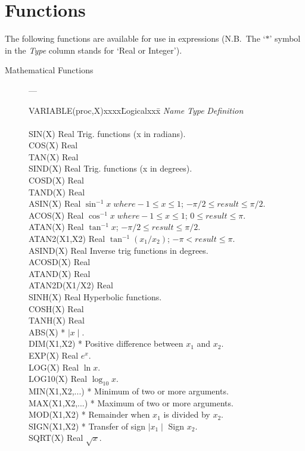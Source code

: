 \section{Functions}

The following functions are available for use in expressions (N.B.\ The `$*$'
symbol in the {\em Type} column stands for `Real or Integer').

\begin{description}

\item [Mathematical Functions] ---

\begin{tabbing}
VARIABLE(proc,X)xxxx\=Logicalxxx\=\kill
{\em Name} \> {\em Type} \> {\em Definition} \\
\\
SIN(X) \> Real \> Trig. functions (x in radians). \\
COS(X) \> Real \\
TAN(X) \> Real \\
SIND(X) \> Real \> Trig. functions (x in degrees). \\
COSD(X) \> Real \\
TAND(X) \> Real \\
ASIN(X) \> Real \> $\sin^{-1} x \; where -1 \leq x \leq 1 $;
 $ -\pi/2 \leq result \leq \pi/2$.\\
ACOS(X) \> Real \> $\cos^{-1} x \; where -1 \leq x \leq 1 $;
 $ 0 \leq result \leq \pi$.\\
ATAN(X) \> Real \> $\tan^{-1} x $; $ -\pi/2 \leq result \leq \pi/2$.\\
ATAN2(X1,X2) \> Real \> $\tan^{-1} (x_{1}/x_{2}) $; $ -\pi < result \leq \pi $.\\
ASIND(X) \> Real \> Inverse trig functions in degrees. \\
ACOSD(X) \> Real \\
ATAND(X) \> Real \\
ATAN2D(X1/X2) \> Real \\
SINH(X) \> Real \> Hyperbolic functions. \\
COSH(X) \> Real \\
TANH(X) \> Real \\
ABS(X) \> * \> $\mid x \mid$.\\
DIM(X1,X2) \> * \> Positive difference between $x_1$ and $x_2$. \\
EXP(X) \> Real \> $e^{x}$. \\
LOG(X) \> Real \> $\ln x$.\\
LOG10(X) \> Real \> $\log_{10} x $.\\
MIN(X1,X2,...) \> * \> Minimum of two or more arguments. \\
MAX(X1,X2,...) \> * \> Maximum of two or more arguments. \\
MOD(X1,X2) \> * \> Remainder when $x_1$ is divided by $x_2$. \\
SIGN(X1,X2) \> * \> Transfer of sign $\mid x_1 \mid$ Sign $x_2$. \\
SQRT(X) \> Real \> $\sqrt{x}$.\\
\end{tabbing}


\end{description}
